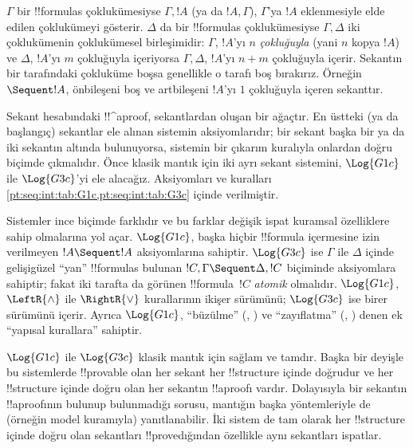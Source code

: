 $\Gamma$ bir !!{formula}s çoklukümesiyse $\Gamma,!A$ (ya da $!A,\Gamma$),
$\Gamma$'ya $!A$ eklenmesiyle elde edilen çoklukümeyi gösterir. $\Delta$ da
bir !!{formula}s çoklukümesiyse $\Gamma,\Delta$ iki çoklukümenin
çoklukümesel birleşimidir: $\Gamma$, $!A$'yı $n$ \emph{çokluğuyla} (yani
$n$ kopya $!A$) ve $\Delta$, $!A$'yı $m$ çokluğuyla içeriyorsa
$\Gamma,\Delta$, $!A$'yı $n+m$ çokluğuyla içerir. Sekantın bir tarafındaki
çokluküme boşsa genellikle o tarafı boş bırakırız. Örneğin $\Sequent !A$,
önbileşeni boş ve artbileşeni $!A$'yı $1$ çokluğuyla içeren sekanttır.

Sekant hesabındaki !!^a{proof}, sekantlardan oluşan bir ağaçtır. En üstteki
(ya da başlangıç) sekantlar ele alınan sistemin aksiyomlarıdır; bir sekant
başka bir ya da iki sekantın altında bulunuyorsa, sistemin bir çıkarım
kuralıyla onlardan doğru biçimde çıkmalıdır. Önce klasik mantık için iki ayrı
sekant sistemini, $\Log{G1c}$ ile $\Log{G3c}$'yi ele alacağız. Aksiyomları ve
kuralları \cref{pt:seq:int:tab:G1c,pt:seq:int:tab:G3c} içinde verilmiştir.


Sistemler ince biçimde farklıdır ve bu farklar değişik ispat kuramsal
özelliklere sahip olmalarına yol açar. $\Log{G1c}$, başka hiçbir !!{formula}
içermesine izin verilmeyen $!A \Sequent !A$ aksiyomlarına sahiptir.
$\Log{G3c}$ ise $\Gamma$ ile $\Delta$ içinde gelişigüzel ``yan'' !!{formula}s
bulunan $!C,\Gamma \Sequent \Delta,!C$ biçiminde aksiyomlara sahiptir; fakat
iki tarafta da görünen !!{formula}~$!C$ \emph{atomik} olmalıdır. $\Log{G1c}$,
$\LeftR{\land}$ ile $\RightR{\lor}$ kurallarının ikişer sürümünü;
$\Log{G3c}$ ise birer sürümünü içerir. Ayrıca $\Log{G1c}$, ``büzülme''
(\LeftR{\Contraction}, \RightR{\Contraction}) ve ``zayıflatma''
(\LeftR{\Weakening}, \RightR{\Weakening}) denen ek ``yapısal kurallara''
sahiptir.

$\Log{G1c}$ ile $\Log{G3c}$ klasik mantık için sağlam ve tamdır. Başka bir
deyişle bu sistemlerde !!{provable} olan her sekant her !!{structure} içinde
doğrudur ve her !!{structure} içinde doğru olan her sekantın !!a{proof}{}ı
vardır. Dolayısıyla bir sekantın !!a{proof}{}ının bulunup bulunmadığı sorusu,
mantığın başka yöntemleriyle de (örneğin model kuramıyla) yanıtlanabilir. İki
sistem de tam olarak her !!{structure} içinde doğru olan sekantları !!{prove}{}dığından
özellikle aynı sekantları ispatlar.

